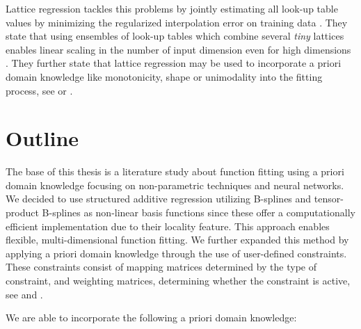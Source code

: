 Lattice regression tackles this problems by jointly estimating all look-up table values by minimizing the regularized interpolation error on training data \cite{garcia2009lattice}. They state that using ensembles of look-up tables which combine several \emph{tiny} lattices enables linear scaling in the number of input dimension even for high dimensions \cite{fard2016fast}. They further state that lattice regression may be used to incorporate a priori domain knowledge like monotonicity, shape or unimodality into the fitting process, see \cite{gupta2016monotonic} or \cite{you2017deep}.

\section{Outline}

The base of this thesis is a literature study about function fitting using a priori domain knowledge focusing on non-parametric techniques and neural networks. We decided to use structured additive regression \cite{fahrmeir2007regression} utilizing B-splines and tensor-product B-splines as non-linear basis functions since these offer a computationally efficient implementation due to their locality feature. This approach enables flexible, multi-dimensional function fitting. We further expanded this method by applying a priori domain knowledge through the use of user-defined constraints. These constraints consist of mapping matrices determined by the type of constraint, and weighting matrices, determining whether the constraint is active, see \cite{hofner2011monotonicity} and \cite{bollaerts2006simple}.

We are able to incorporate the following a priori domain knowledge: 

